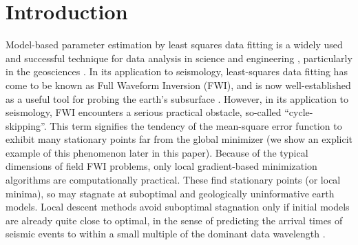 \begin{abstract}

\end{abstract}

\section{Introduction}
Model-based parameter estimation by least squares data fitting is a
widely used and successful technique for data analysis in science and
engineering \cite{Bertero:98,Vogel:02}, particularly in the
geosciences \cite{Parker:94,Tarantola:05}. In its application to
seismology, least-squares data fitting has come to be known as Full
Waveform Inversion (FWI), and is now well-established as a useful tool
for probing the earth's subsurface
\cite[]{VirieuxOperto:09,Fichtner:10,Schuster:17}. However, in its
application to seismology, FWI encounters a serious
practical obstacle, so-called ``cycle-skipping''. This term signifies
the tendency of the mean-square error function to exhibit many
stationary points far from the global minimizer (we
show an explicit example of this phenomenon later in this paper). Because of the
typical dimensions of field FWI problems, only local gradient-based
minimization algorithms are computationally practical. These find
stationary points (or local minima), so may stagnate at suboptimal and geologically
uninformative earth models. Local descent methods avoid suboptimal
stagnation only if initial models are already quite close to optimal,
in the sense of predicting the arrival times of seismic events to
within a small multiple of the dominant data wavelength
\cite[]{GauTarVir:86,VirieuxOperto:09,Plessix:10}.

